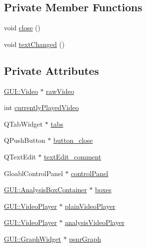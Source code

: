 \subsection*{Private Member Functions}
\begin{DoxyCompactItemize}
\item 
void \hyperlink{classGUI_1_1AnalysisBox_a5ae591df94fc66ccb85cbb6565368bca}{close} ()
\item 
void \hyperlink{classGUI_1_1AnalysisBox_a92832e204f5bab2138a91c2a248b0730}{text\+Changed} ()
\end{DoxyCompactItemize}
\subsection*{Private Attributes}
\begin{DoxyCompactItemize}
\item 
\hyperlink{classGUI_1_1Video}{G\+U\+I\+::\+Video} $\ast$ \hyperlink{classGUI_1_1AnalysisBox_a36ae288eba0c53b885d93498c8c68469}{raw\+Video}
\item 
int \hyperlink{classGUI_1_1AnalysisBox_a42c7f34314887139c2b847a2fc190cd5}{currently\+Played\+Video}
\item 
Q\+Tab\+Widget $\ast$ \hyperlink{classGUI_1_1AnalysisBox_a84b21f36a5a1a5750502d3611321cef2}{tabs}
\item 
Q\+Push\+Button $\ast$ \hyperlink{classGUI_1_1AnalysisBox_a2ea06b6d8f34f05fdbfbaa0a09293a33}{button\+\_\+close}
\item 
Q\+Text\+Edit $\ast$ \hyperlink{classGUI_1_1AnalysisBox_ad9cff9fc5b4f7a96f3c7a996dece6155}{text\+Edit\+\_\+comment}
\item 
Gloabl\+Control\+Panel $\ast$ \hyperlink{classGUI_1_1AnalysisBox_a22a072a13da697f378cb26be7be72abe}{control\+Panel}
\item 
\hyperlink{classGUI_1_1AnalysisBoxContainer}{G\+U\+I\+::\+Analysis\+Box\+Container} $\ast$ \hyperlink{classGUI_1_1AnalysisBox_a63274682527f704e5bcd1931c770b8c5}{boxes}
\item 
\hyperlink{classGUI_1_1VideoPlayer}{G\+U\+I\+::\+Video\+Player} $\ast$ \hyperlink{classGUI_1_1AnalysisBox_a14ff456773f3f51fe1aba760747cca31}{plain\+Video\+Player}
\item 
\hyperlink{classGUI_1_1VideoPlayer}{G\+U\+I\+::\+Video\+Player} $\ast$ \hyperlink{classGUI_1_1AnalysisBox_a80c4876f9f65457ab392c5b5749aff04}{analysis\+Video\+Player}
\item 
\hyperlink{classGUI_1_1GraphWidget}{G\+U\+I\+::\+Graph\+Widget} $\ast$ \hyperlink{classGUI_1_1AnalysisBox_a582bcfbffcea9f3eaa27afcc74bd0ea2}{psnr\+Graph}

\end{DoxyCompactItemize}
